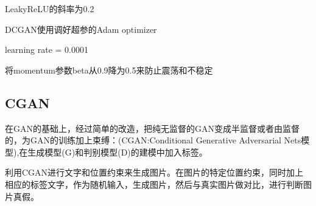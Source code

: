 \documentclass[openbib]{article}
\begin{document}
LeakyReLU的斜率为0.2

DCGAN使用调好超参的Adam optimizer

learning rate = 0.0001

将momentum参数beta从0.9降为0.5来防止震荡和不稳定

\subsection{CGAN}

在GAN的基础上，经过简单的改造，把纯无监督的GAN变成半监督或者由监督的，为GAN的训练加上束缚：(CGAN:Conditional Generative Adversarial Nets模型),在生成模型(G)和判别模型(D)的建模中加入标签。

利用CGAN进行文字和位置约束来生成图片。在图片的特定位置约束，同时加上相应的标签文字，作为随机输入，生成图片，然后与真实图片做对比，进行判断图片真假。
\end{document}
